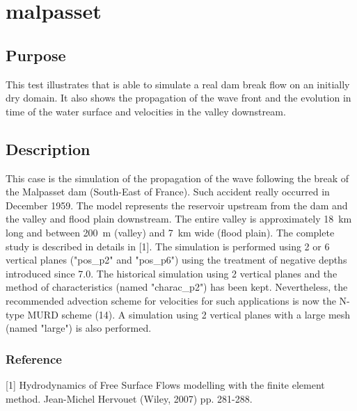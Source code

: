 \chapter{malpasset}
%
%
\section{Purpose}
%
This test illustrates that  is able to simulate a real dam
break flow on an initially dry domain.
It also shows the propagation of the wave front and the evolution in
time of the water surface and velocities in the valley downstream.
%
\section{Description}
%
This case is the simulation of the propagation of the wave following
the break of the Malpasset dam (South-East of France).
Such accident really occurred in December 1959.
The model represents the reservoir upstream from the dam and the valley
and flood plain downstream.
The entire valley is approximately 18~km long and between 200~m (valley)
and 7~km wide (flood plain).
The complete study is described in details in [1].
The simulation is performed using 2 or 6 vertical planes ("pos\_p2" and
"pos\_p6") using the treatment of negative depths introduced since
 7.0.
The historical simulation using 2 vertical planes and the method of
characteristics (named "charac\_p2") has been kept.
Nevertheless, the recommended advection scheme for velocities for such
applications is now the N-type MURD scheme (14).
A simulation using 2 vertical planes with a large mesh (named
"large") is also performed.
%
%
%
%
\subsection{Reference}
%
[1] Hydrodynamics of Free Surface Flows modelling with the finite
element method. Jean-Michel Hervouet (Wiley, 2007) pp. 281-288.
%
%
%
